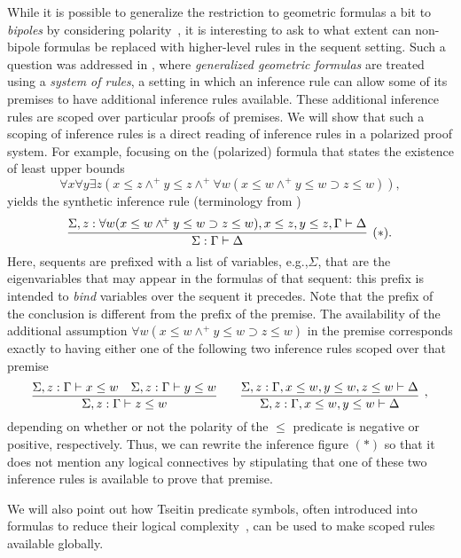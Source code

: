 \documentclass[runningheads]{llncs}
\newcommand{\eg}{e.g.,\xspace}
\newcommand{\imp}{\supset}
\newcommand{\wedgep}{\wedge^{\!+}}
\newcommand{\Twoseq}[3]{#1:#2\vdash #3}
\begin{document}
While it is possible to generalize the restriction to geometric
formulas a bit to \emph{bipoles} by considering
polarity~\cite{marin22apal}, it is interesting to ask to what extent
can non-bipole formulas be replaced with higher-level rules in the
sequent setting.  Such a question was addressed in \cite{negri16jlc},
where \emph{generalized geometric formulas} are treated using a
\emph{system of rules}, a setting in which an inference rule can allow
some of its premises to have additional inference rules available.
These additional inference rules are scoped over particular proofs of
premises.  We will show that such a scoping of inference rules is a
direct reading of inference rules in a polarized proof system.  For
example, focusing on the (polarized) formula that states the
existence of least upper bounds
\[
  \forall x\forall y\exists z(x\le z\wedgep y\le z\wedgep
              \forall w(x\le w\wedgep y\le w\imp z\le w)),
\]
yields the synthetic inference rule (terminology from
\cite{marin22apal})
\[
  \infer[(*).]
        {\Twoseq{\Sigma}{\Gamma}{\Delta}}
        {\Twoseq{\Sigma,z}
                {\forall w(x\le w\wedgep y\le w\imp z\le w),
                   x\le z,y\le z,\Gamma}
                {\Delta}}
\]
Here, sequents are prefixed with a list of variables, \eg $\Sigma$,
that are the eigenvariables that may appear in the formulas of that
sequent: this prefix is intended to \emph{bind} variables over the
sequent it precedes.  Note that the prefix of the conclusion is
different from the prefix of the premise.  The availability of the
additional assumption $\forall w(x\le w\wedgep y\le w\imp z\le w)$ in
the premise corresponds exactly to having either one of the following
two inference rules scoped over that premise
\[
  \infer
        {\Twoseq{\Sigma,z}{\Gamma}{z\le w}}
        {\Twoseq{\Sigma,z}{\Gamma}{x\le w} & \Twoseq{\Sigma,z}{\Gamma}{y\le w}}
  \qquad
  \infer[,]
        {\Twoseq{\Sigma,z}{\Gamma,x\le w,y\le w}{\Delta}}
        {\Twoseq{\Sigma,z}{\Gamma,x\le w,y\le w, z\le w}{\Delta}}
\]
depending on whether or not the polarity of the $\le$ predicate is
negative or positive, respectively.  Thus, we can rewrite the
inference figure $(*)$ so that it does not mention any logical
connectives by stipulating that one of these two inference rules is
available to prove that premise.

We will also point out how Tseitin predicate symbols, often introduced
into formulas to reduce their logical complexity~\cite{blair86cor}, can
be used to make scoped rules available globally.

%


\end{document}
